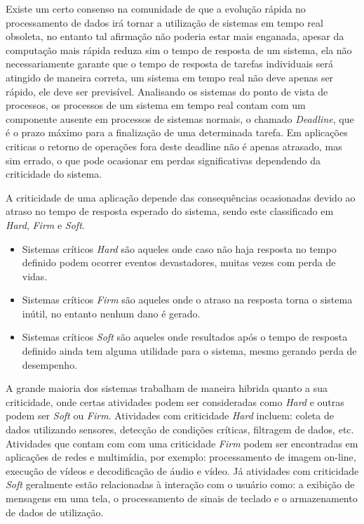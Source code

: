 Existe um certo consenso na comunidade de que a evolução rápida no processamento de dados irá tornar a utilização de sistemas em tempo real obsoleta, no entanto tal afirmação não poderia estar mais enganada, apesar da computação mais rápida reduza sim o tempo de resposta de um sistema, ela não necessariamente garante que o tempo de resposta de tarefas individuais será atingido de maneira correta, um sistema em tempo real não deve apenas ser rápido, ele deve ser previsível. Analisando os sistemas do ponto de vista de processos, os processos de um sistema em tempo real contam com um componente ausente em processos de sistemas normais, o chamado \textit{Deadline}, que é o prazo máximo para a finalização de uma determinada tarefa. Em aplicações criticas o retorno de operações fora deste deadline não é apenas atrasado, mas sim errado, o que pode ocasionar em perdas significativas dependendo da criticidade do sistema.

A criticidade de uma aplicação depende das consequências ocasionadas devido ao atraso no tempo de resposta esperado do sistema, sendo este classificado em \textit{Hard}, \textit{Firm} e \textit{Soft}.
\begin{itemize}
\item Sistemas críticos \textit{Hard} são aqueles onde caso não haja resposta no tempo definido podem ocorrer eventos devastadores, muitas vezes com perda de vidas.
\item Sistemas críticos \textit{Firm} são aqueles onde o atraso na resposta torna o sistema inútil, no entanto nenhum dano é gerado.
\item Sistemas críticos \textit{Soft} são aqueles onde resultados após o tempo de resposta definido ainda tem alguma utilidade para o sistema, mesmo gerando perda de desempenho.
\end{itemize}

A grande maioria dos sistemas trabalham de maneira hibrida quanto a sua criticidade, onde certas atividades podem ser consideradas como \textit{Hard} e outras podem ser \textit{Soft} ou \textit{Firm}. Atividades com criticidade \textit{Hard} incluem: coleta de dados utilizando sensores, detecção de condições críticas, filtragem de dados, etc. Atividades que contam com com uma criticidade \textit{Firm} podem ser encontradas em aplicações de redes e multimídia, por exemplo: processamento de imagem on-line, execução de vídeos e decodificação de áudio e vídeo. Já atividades com criticidade \textit{Soft} geralmente estão relacionadas à interação com o usuário como: a exibição de mensagens em uma tela, o processamento de sinais de teclado e o armazenamento de dados de utilização.

